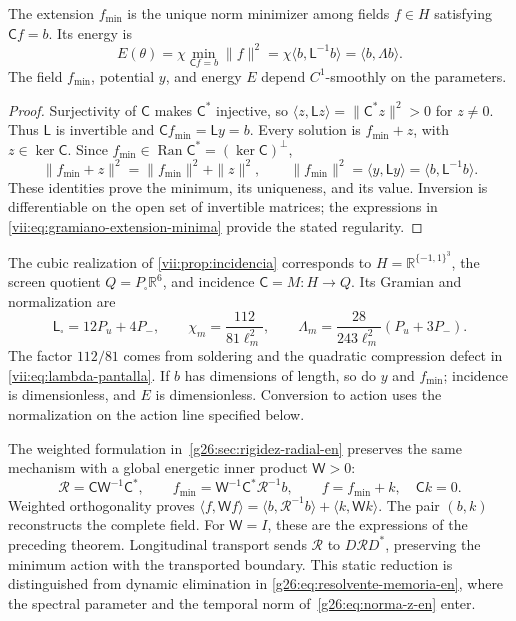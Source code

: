 \begin{proposition}
\label{vii:prop:minimo-parametrizado}
The extension \(f_{\min}\) is the unique norm minimizer among
fields \(f\in H\) satisfying \(\mathsf C f=b\). Its energy is
\begin{equation}
 E(\theta)=\chi\min_{\mathsf C f=b}\|f\|^2
 =\chi\langle b,\mathsf L^{-1}b\rangle
 =\langle b,\Lambda b\rangle.
 \label{vii:eq:energia-extension-minima}
\end{equation}
The field \(f_{\min}\), potential \(y\), and energy \(E\)
depend \(C^1\)-smoothly on the parameters.
\end{proposition}

\begin{proof}
Surjectivity of \(\mathsf C\) makes \(\mathsf C^*\) injective,
so \(\langle z,\mathsf Lz\rangle=\|\mathsf C^*z\|^2>0\)
for \(z\ne0\). Thus \(\mathsf L\) is invertible and
\(\mathsf C f_{\min}=\mathsf L y=b\). Every solution is
\(f_{\min}+z\), with \(z\in\ker\mathsf C\). Since
\(f_{\min}\in\operatorname{Ran}\mathsf C^*=(\ker\mathsf C)^\perp\),
\[
 \|f_{\min}+z\|^2=\|f_{\min}\|^2+\|z\|^2,
 \qquad
 \|f_{\min}\|^2=\langle y,\mathsf L y\rangle
 =\langle b,\mathsf L^{-1}b\rangle.
\]
These identities prove the minimum, its uniqueness, and its value. Inversion
is differentiable on the open set of invertible matrices;
the expressions in \eqref{vii:eq:gramiano-extension-minima} provide
the stated regularity.
\end{proof}

The cubic realization of \ref{vii:prop:incidencia} corresponds to
\(H=\mathbb R^{\{-1,1\}^3}\), the screen quotient
\(Q=P_\square\mathbb R^6\), and incidence \(\mathsf C=M:H\to Q\).
Its Gramian and normalization are
\begin{equation}
 \mathsf L_\square=12P_u+4P_-,\qquad
 \chi_m=\frac{112}{81\ell_m^2},\qquad
 \Lambda_m=\frac{28}{243\ell_m^2}(P_u+3P_-).
 \label{vii:eq:normalizacion-minimo-cubico}
\end{equation}
The factor \(112/81\) comes from soldering and the quadratic
compression defect in \eqref{vii:eq:lambda-pantalla}. If \(b\) has dimensions
of length, so do \(y\) and \(f_{\min}\); incidence is
dimensionless, and \(E\) is dimensionless. Conversion to action uses
the normalization on the action line specified below.

The weighted formulation in~\ref{g26:sec:rigidez-radial-en} preserves
the same mechanism with a global energetic inner product \(\mathsf W>0\):
\[
 \mathcal R=\mathsf C\mathsf W^{-1}\mathsf C^*,\qquad
 f_{\min}=\mathsf W^{-1}\mathsf C^*\mathcal R^{-1}b,
 \qquad f=f_{\min}+k,\quad \mathsf Ck=0.
\]
Weighted orthogonality proves
\(\langle f,\mathsf Wf\rangle
=\langle b,\mathcal R^{-1}b\rangle+\langle k,\mathsf Wk\rangle\).
The pair \((b,k)\) reconstructs the complete field. For \(\mathsf W=I\),
these are the expressions of the preceding theorem. Longitudinal
transport sends \(\mathcal R\) to \(D\mathcal RD^*\), preserving
the minimum action with the transported boundary. This static reduction
is distinguished from dynamic elimination in
\eqref{g26:eq:resolvente-memoria-en}, where the spectral parameter
and the temporal norm of~\eqref{g26:eq:norma-z-en} enter.

